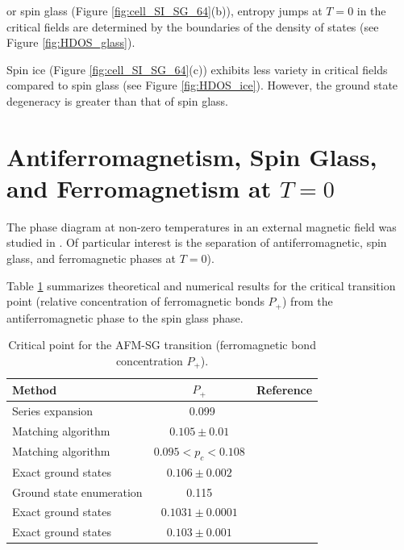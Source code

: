 \documentclass[utf8, babel, sor, jor, amsmath, amssymb, reprint]{elsarticle} %
\begin{document}
or spin glass (Figure \ref{fig:cell_SI_SG_64}(b)), entropy jumps at $T=0$ in the critical fields are determined by the boundaries of the density of states (see Figure \ref{fig:HDOS_glass}).


Spin ice (Figure \ref{fig:cell_SI_SG_64}(c)) exhibits less variety in critical fields compared to spin glass (see Figure \ref{fig:HDOS_ice}). However, the ground state degeneracy is greater than that of spin glass.


\section{Antiferromagnetism, Spin Glass, and Ferromagnetism at $T = 0$}

The phase diagram at non-zero temperatures in an external magnetic field was studied in \cite{trukhin4855337thermodynamic}. Of particular interest is the separation of antiferromagnetic, spin glass, and ferromagnetic phases at $T = 0$).

Table \ref{tab:lit_phase} summarizes theoretical and numerical results for the critical transition point (relative concentration of ferromagnetic bonds $P_+$) from the antiferromagnetic phase to the spin glass phase.

\begin{table}[!h]
	\centering
	\begin{tabular}{|l|c|l|}
		\hline
		Method & \( P_{+} \) & Reference \\ \hline
		Series expansion & ~0.099 & \cite{PhysRevB.19.260} \\ \hline
		Matching algorithm & \( 0.105 \pm 0.01 \) & \cite{H_Freund_1989} \\ \hline
		Matching algorithm & \( 0.095 < p_c < 0.108 \) & \cite{BENDISCH1994139} \\ \hline
		Exact ground states & \( 0.106 \pm 0.002 \) & \cite{N.Kawashima_1997} \\ \hline
		Ground state enumeration & 0.115 & \cite{PhysRevE.58.1502} \\ \hline
		Exact ground states & \( 0.1031 \pm 0.0001 \) & \cite{WANG200331} \\ \hline
		Exact ground states & \( 0.103 \pm 0.001 \) & \cite{amoruso2004domain} \\ \hline
	\end{tabular}
	\caption{Critical point for the AFM-SG transition (ferromagnetic bond concentration \( P_+ \)).}
	\label{tab:lit_phase}
\end{table}
\end{document}
